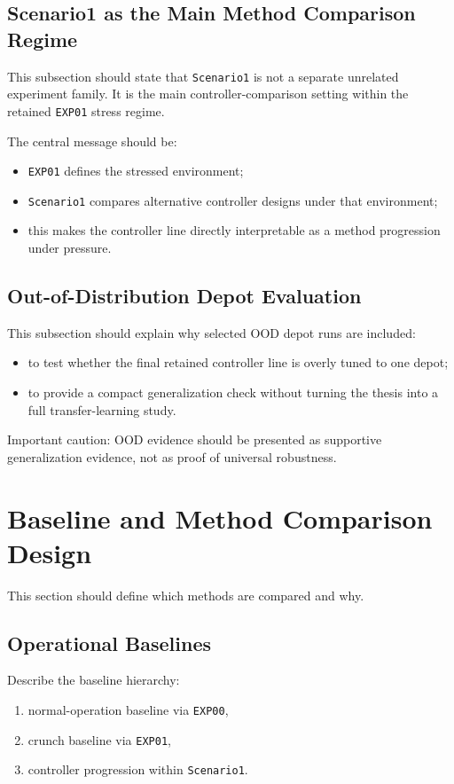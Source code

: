 \subsection{Scenario1 as the Main Method Comparison Regime}

This subsection should state that \texttt{Scenario1} is not a separate unrelated experiment family. It is the main controller-comparison setting within the retained \texttt{EXP01} stress regime.

The central message should be:
\begin{itemize}
    \item \texttt{EXP01} defines the stressed environment;
    \item \texttt{Scenario1} compares alternative controller designs under that environment;
    \item this makes the controller line directly interpretable as a method progression under pressure.
\end{itemize}

\subsection{Out-of-Distribution Depot Evaluation}

This subsection should explain why selected OOD depot runs are included:
\begin{itemize}
    \item to test whether the final retained controller line is overly tuned to one depot;
    \item to provide a compact generalization check without turning the thesis into a full transfer-learning study.
\end{itemize}

\noindent Important caution:
OOD evidence should be presented as supportive generalization evidence, not as proof of universal robustness.

\section{Baseline and Method Comparison Design}

This section should define which methods are compared and why.

\subsection{Operational Baselines}

Describe the baseline hierarchy:
\begin{enumerate}
    \item normal-operation baseline via \texttt{EXP00},
    \item crunch baseline via \texttt{EXP01},
    \item controller progression within \texttt{Scenario1}.
\end{enumerate}

